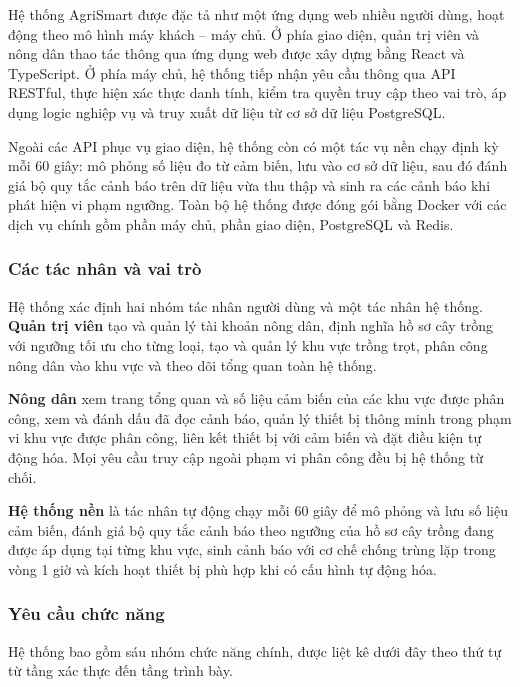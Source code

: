 \documentclass[13pt,a4paper]{extarticle}
\numberwithin{figure}{section}
\numberwithin{table}{section}
\begin{document}
	Hệ thống AgriSmart được đặc tả như một ứng dụng web nhiều người dùng, hoạt động theo mô hình máy khách -- máy chủ. Ở phía giao diện, quản trị viên và nông dân thao tác thông qua ứng dụng web được xây dựng bằng React và TypeScript. Ở phía máy chủ, hệ thống tiếp nhận yêu cầu thông qua API RESTful, thực hiện xác thực danh tính, kiểm tra quyền truy cập theo vai trò, áp dụng logic nghiệp vụ và truy xuất dữ liệu từ cơ sở dữ liệu PostgreSQL.
	
	Ngoài các API phục vụ giao diện, hệ thống còn có một tác vụ nền chạy định kỳ mỗi 60 giây: mô phỏng số liệu đo từ cảm biến, lưu vào cơ sở dữ liệu, sau đó đánh giá bộ quy tắc cảnh báo trên dữ liệu vừa thu thập và sinh ra các cảnh báo khi phát hiện vi phạm ngưỡng. Toàn bộ hệ thống được đóng gói bằng Docker với các dịch vụ chính gồm phần máy chủ, phần giao diện, PostgreSQL và Redis.
	
	\subsubsection{Các tác nhân và vai trò}
	
	Hệ thống xác định hai nhóm tác nhân người dùng và một tác nhân hệ thống. \textbf{Quản trị viên} tạo và quản lý tài khoản nông dân, định nghĩa hồ sơ cây trồng với ngưỡng tối ưu cho từng loại, tạo và quản lý khu vực trồng trọt, phân công nông dân vào khu vực và theo dõi tổng quan toàn hệ thống.
	
	\textbf{Nông dân} xem trang tổng quan và số liệu cảm biến của các khu vực được phân công, xem và đánh dấu đã đọc cảnh báo, quản lý thiết bị thông minh trong phạm vi khu vực được phân công, liên kết thiết bị với cảm biến và đặt điều kiện tự động hóa. Mọi yêu cầu truy cập ngoài phạm vi phân công đều bị hệ thống từ chối.
	
	\textbf{Hệ thống nền} là tác nhân tự động chạy mỗi 60 giây để mô phỏng và lưu số liệu cảm biến, đánh giá bộ quy tắc cảnh báo theo ngưỡng của hồ sơ cây trồng đang được áp dụng tại từng khu vực, sinh cảnh báo với cơ chế chống trùng lặp trong vòng 1 giờ và kích hoạt thiết bị phù hợp khi có cấu hình tự động hóa.
	
	\subsubsection{Yêu cầu chức năng}
	
	Hệ thống bao gồm sáu nhóm chức năng chính, được liệt kê dưới đây theo thứ tự từ tầng xác thực đến tầng trình bày.
	
\end{document}
